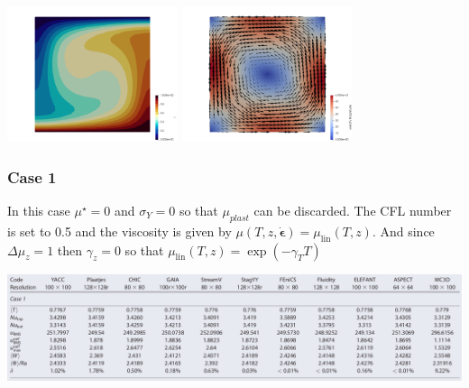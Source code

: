 \includegraphics[width=5cm]{python_codes/fieldstone_28/results_case0/temp}
\includegraphics[width=5cm]{python_codes/fieldstone_28/results_case0/vel}



\newpage %
\subsubsection*{Case 1}

In this case $\mu^\star=0$ and $\sigma_Y=0$ so that $\mu_{plast}$ can be discarded.
The CFL number is set to 0.5 and the viscosity is given by 
$\mu(T,z,\dot{\boldsymbol{\epsilon}}) =   \mu_\text{lin}(T,z) $.
And since $\Delta \mu_z=1$ then $\gamma_z=0$ so that
$\mu_\text{lin} (T,z) = \exp(-\gamma_T T )$


\begin{center}
\includegraphics[width=16cm]{python_codes/fieldstone_28/results_case1/tosn15b}
\end{center}

